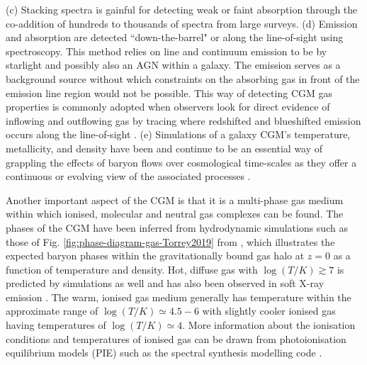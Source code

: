 (c) Stacking spectra is gainful for detecting weak or faint absorption through the co-addition of hundreds to thousands of spectra from large surveys. (d) Emission and absorption are detected ``down-the-barrel" or along the line-of-sight using spectroscopy. This method relies on line and continuum emission to be by starlight and possibly also an AGN within a galaxy. The emission serves as a background source without which constraints on the absorbing gas in front of the emission line region would not be possible. This way of detecting CGM gas properties is commonly adopted when observers look for direct evidence of inflowing and outflowing gas by tracing where redshifted and blueshifted emission occurs along the line-of-sight \citep{Steidel2010,Heckman2015}. (e) Simulations of a galaxy CGM's temperature, metallicity, and density have been and continue to be an essential way of grappling the effects of baryon flows over cosmological time-scales as they offer a continuous or evolving view of the associated processes \citep{SomervilleDave2015}.

Another important aspect of the CGM is that it is a multi-phase gas medium within which ionised, molecular and neutral gas complexes can be found. The phases of the CGM have been inferred from hydrodynamic simulations such as those of Fig. \ref{fig:phase-diagram-gas-Torrey2019} from \citet{Torrey2019}, which illustrates the expected baryon phases within the gravitationally bound gas halo at $z=0$ as a function of temperature and density. Hot, diffuse gas with $\log{(T/K)} \gtrsim 7$ is predicted by simulations as well and has also been observed in soft X-ray emission \citep{AndersonBregman2010}. The warm, ionised gas medium generally has temperature within the approximate range of $\log{(T/K)} \simeq 4.5 - 6$ with slightly cooler ionised gas having temperatures of $\log{(T/K)} \simeq 4.$ More information about the ionisation conditions and temperatures of ionised gas can be drawn from photoionisation equilibrium models (PIE) such as the spectral synthesis modelling code  \citep{Ferland2013}. 

